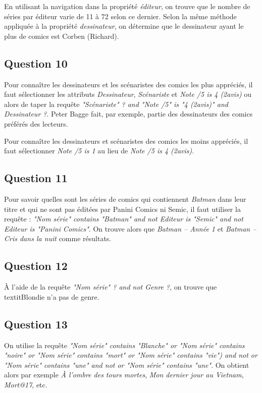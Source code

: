 \documentclass[a4paper,12pt]{article}
\begin{document}
En utilisant la navigation dans la propriété \textit{éditeur}, on trouve que le nombre de séries par éditeur varie de 11 à 72 selon ce dernier.
Selon la même méthode appliquée à la propriété \textit{dessinateur}, on détermine que le dessinateur ayant le plus de comics est Corben (Richard).


\subsection*{Question 10}

Pour connaître les dessinateurs et les scénaristes des comics les plus appréciés, il faut sélectionner les attributs \textit{Dessinateur}, \textit{Scénariste} et \textit{Note /5 is 4 (2avis)} ou alors de taper la requête \textit{"Scénariste" ? and "Note /5" is  "4 (2avis)" and Dessinateur ?}. Peter Bagge fait, par exemple, partie des dessinateurs des comics préférés des lecteurs.

Pour connaître les dessinateurs et scénaristes des comics les moins appréciés, il faut sélectionner \textit{Note /5 is 1} au lieu de \textit{Note /5 is 4 (2avis)}.


\subsection*{Question 11}

Pour savoir quelles sont les séries de comics qui contiennent \textit{Batman} dans leur titre et qui ne sont pas éditées par Panini Comics ni Semic, il faut utiliser la requête : \textit{"Nom série" contains "Batman" and not Editeur is "Semic" and not Editeur is "Panini Comics"}. On trouve alors que \textit{Batman – Année 1} et \textit{Batman – Cris dans la nuit} comme résultats.


\subsection*{Question 12}

\`A l'aide de la requête \textit{"Nom série" ? and not Genre ?}, on trouve que textit{Blondie} n'a pas de genre.


\subsection*{Question 13}

On utilise la requête \textit{"Nom série" contains "Blanche" or "Nom série" contains "noire" or "Nom série" contains "mort" or "Nom série" contains "vie") and not or "Nom série" contains "une" and not or "Nom série" contains "une"}. On obtient alors par exemple \textit{\`A l'ombre des tours mortes}, \textit{Mon dernier jour au Vietnam}, \textit{Mort@17}, etc.
\end{document}
